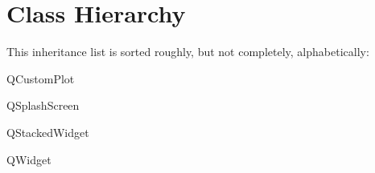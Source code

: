 \section{Class Hierarchy}
This inheritance list is sorted roughly, but not completely, alphabetically\+:\begin{DoxyCompactList}
\item {}
\item Q\+Custom\+Plot\begin{DoxyCompactList}
\item {}
\end{DoxyCompactList}
\item Q\+Splash\+Screen\begin{DoxyCompactList}
\item {}
\end{DoxyCompactList}
\item Q\+Stacked\+Widget\begin{DoxyCompactList}
\item {}
\end{DoxyCompactList}
\item Q\+Widget\begin{DoxyCompactList}
\item {}
\item {}
\item {}
\item {}
\end{DoxyCompactList}
\item {}
\begin{DoxyCompactList}
\item {}
\item {}
\item {}
\end{DoxyCompactList}
\end{DoxyCompactList}
